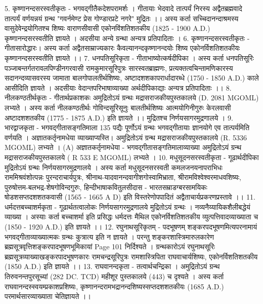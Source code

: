 5. कृष्णानन्दसरस्वतीकृतः - भगवद्गीतैकदेशपरामर्शः । 
गीतायाः भेदवादे तात्पर्यं निरस्य अद्वैतब्रह्मवादे तात्पर्यं वर्णयन्नयं ग्रन्थ "गवर्नमेण्ट प्रेस गोण्डारप्रटे नगरे" मुद्रितः ।। अस्य कर्ता सच्चिदानन्दाश्रमस्य वासुदेवेन्द्रयोगितश्च शिष्यः वाराणसीवासी एकोनविंशतिशतकीय  (1825 - 1900 A.D.) कृष्णानन्दसरस्वतीति ज्ञायते । अदसीया अन्ये ग्रन्था अन्यत्र प्रतिपादिताः । 
6. कृष्णानन्दसरस्वतीकृतः - गीतासारोद्धारः। अस्य कर्ता अद्वैतसाम्राज्यकारः कैवल्यानन्दकृष्णानन्दयोः शिष्य एकोनर्विशतिशतकीयः कृष्णानन्दसरस्वतीति ज्ञायते ।। 
7. धनपतिसूरिकृता - गीताभाष्योत्कर्षदीपिका ।
अस्य कर्ता धनपतिसूरिः पञ्जाबन्तर्गतरावलपिण्डीनगरवासी रामकुमारसूरिपुत्रः सारस्वतब्राह्मणः, प्रत्यक्तत्वचिन्तामणिकारस्य सदानन्दव्यासवरस्य जामाता बालगोपालतीर्थशिष्यः, अष्टादशशकापरार्धादारब्धे (1750 - 1850 A.D.) काले आसीदिति ज्ञायते । अदसीयाः वेदान्तपरिभाषाव्याख्या अर्थदीपिकाद्याः अन्यत्र प्रतिपादिताः ।। 
8. नीलकण्ठतीर्थकृतः - गीतार्थप्रकाशकः  
अमुद्रितोऽयं ग्रन्थः मद्रासराजकीयपुस्तकालये (D. 2081 MGOML) लभ्यते । अस्य कर्ता नीलकण्ठतीर्थः गोविन्दसूरिसूनुः बालतीर्थशिष्यः आत्मयोगिनीगुरुः केरलवासी अष्टादशशतकीय (1775 - 1875 A.D.) इति ज्ञायते ।। मुद्रितश्च निर्णयसागरमुद्रणालये । 
9. भारद्वाजकृता - भगवद्गीतासङ्गतिमाला
135 पद्यैः पूर्णोऽयं ग्रन्थः भगवद्गीतायाः ज्ञानयोगे एव तात्पर्यमिति वर्णयति । अज्ञातकर्तृनामधेया व्याख्याप्यस्ति। अमुद्रितोऽयं ग्रन्थ मद्रासराजकीयपुस्तकालये (R. 5336 MGOML) लभ्यते ।
(A) अज्ञातकर्तृनामधेया - भगवद्गीतासङ्गतिमालाव्याख्या 
अमुद्रितोऽयं ग्रन्थ मद्रासराजकीयपुस्तकालये ( R 533 E MGOML) लभ्यते । 
10. मधुसूदनसरस्वतीकृता - गूढार्थदीपिका 
मुद्रितोऽयं ग्रन्थः निर्णयसागरमुद्रणालये । अस्य कर्ता मधुसूदनसरस्वती कमलजनयनापराभिधः राममिश्रवंशोत्पन्नः पुरन्दराचार्यपुत्रः, श्रीनाथ-यादवानन्दवागीशगोस्वामिभ्राता, श्रीरामविश्वेश्वरमाधवशिष्यः, पुरुषोत्तम-बलभद्र-शेषगोविन्दगुरुः, हिन्दीभाषाकवितुलसीदास - भारतसम्राडग्बरसामयिकः षोडशसप्तदशशतकवासी (1565 -  1665 A D) इति विस्तरेणोपपादितं अद्वैताचार्यप्रकरणप्रस्तावे ।। 
11. धर्मदत्तबच्चाशर्मकृता - गूढार्थतत्वालोकः 
निर्णयसागरमुद्रणालये मुद्रितोऽयं ग्रन्थः । नव्यनैय्यायिकशैलीबद्धेयं व्याख्या । अस्याः कर्ता बच्चाशर्मा इति प्रसिद्धः धर्मदत्तः मैथिल एकोनर्विशतिशतकीय व्युत्पत्तिवादव्याख्याता च (1850 - 1920 A.D.) इति ज्ञायते ।। 
12. रघुनाथसूरिकृतम् - पदभूषणम् 
शङ्करपदभूषणमित्यपरनामायं भगवद्गीताव्याख्यात्मकः ग्रन्थः कुत्रात्य इति न ज्ञायते । परन्तु शङ्करशास्त्रिमारुलकारेण ब्रह्मसूत्रवृत्तिशङ्करपादभूषणभूमिकायां Page 101 निर्दिश्यते । ग्रन्थकारोऽयं रघुनाथसूरिः ब्रह्मसूत्रव्याख्याखङ्करपादभूषणकारः रामचन्द्रसूरिपुत्रः रामशास्त्रिपिता राघवाचार्यशिष्यः, एकोनर्विशतिशतकीय (1850 A.D.) इति ज्ञायते ।। 
13. राघवानन्दकृता - तत्वार्थचन्द्रिका । 
अमुद्रितोऽयं ग्रन्थ तिरुवनन्तपुरसूच्यां (282 DC. TCD) महीशूर पुस्तकालये (443) च दृश्यते । अस्य कर्ता राघवानन्दस्स्वयम्प्रकाशप्रशिष्यः, कृष्णानन्दरामभद्रानन्दशिष्यस्सप्तदशशतकीयः (1685 A.D.) परमार्थसारव्याख्याता चेतिज्ञायते ।। 
